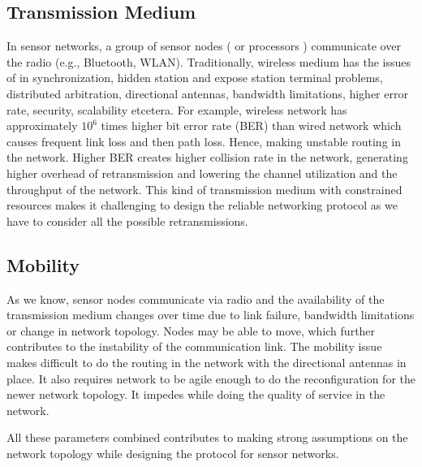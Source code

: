 	\subsection{Transmission Medium}
		In sensor networks, a group of sensor nodes ( or processors ) communicate over the radio (e.g., Bluetooth, WLAN).
		Traditionally, wireless medium has the issues of in synchronization, hidden station and expose station terminal problems, distributed arbitration, directional antennas, bandwidth limitations, higher error rate, security, scalability etcetera.
		For example, wireless network has approximately $10^6$ times higher bit error rate (BER) than wired network which causes frequent link loss and then path loss. 
		Hence, making unstable routing in the network.
		Higher BER creates higher collision rate in the network, generating higher overhead of retransmission and lowering the channel utilization and the throughput of the network.
		This kind of transmission medium with constrained resources makes it challenging to design the reliable networking protocol as we have to consider all the possible retransmissions.

	\subsection{Mobility}
		As we know, sensor nodes communicate via radio and the availability of the transmission medium changes over time due to link failure, bandwidth limitations or change in network topology.
		Nodes may be able to move, which further contributes to the instability of the communication link.
		The mobility issue makes difficult to do the routing in the network with the directional antennas in place.
		It also requires network to be agile enough to do the reconfiguration for the newer network topology.
		It impedes while doing the quality of service in the network. 
		
	All these parameters combined contributes to making strong assumptions on the network topology while designing the protocol for sensor networks.